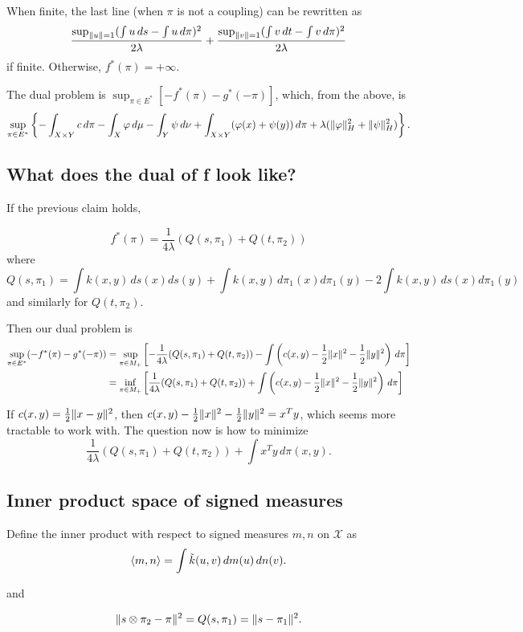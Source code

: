When finite, the last line (when $\pi$ is not a coupling) can be rewritten as
$$\frac{\sup_{\lVert u\rVert=1} (\int u\,ds - \int u\,d\pi)^2}{2\lambda} + \frac{\sup_{\lVert v\rVert=1}(\int v\,dt - \int v\,d\pi)^2}{2\lambda}$$ if finite. Otherwise, $f^{*}(\pi)=+\infty$.

The dual problem is $\sup_{\pi\in E^{*}} \left[ -f^{*}(\pi)-g^{*}(-\pi)\right] $, which, from the above, is
$$ \sup_{\pi\in E^{*}} \left\lbrace - \int_{X\times Y} c\,d\pi - \int_X \varphi\,d\mu - \int_Y \psi\,d\nu + \int_{X\times Y} (\varphi(x)+\psi(y))\,d\pi + \lambda(\lVert\varphi\rVert_H^2+\lVert\psi\rVert_H^2)\right\rbrace . $$

\subsection*{What does the dual of f look like?}

If the previous claim holds,

$$
f^{*}(\pi) = \frac{1}{4\lambda} \left(Q(s,\pi_1) + Q(t,\pi_2)\right)
$$ where $$Q(s,\pi_1) = \int k(x,y)\,ds(x) ds(y) + \int k(x,y)\,d\pi_1(x) d\pi_1(y) - 2 \int k(x,y)\,ds(x)d\pi_1(y)$$ and similarly for $Q(t,\pi_2)$.

Then our dual problem is
\begin{align*}
\sup_{\pi\in E^{*}}(-f^{*}(\pi) - g^{*}(-\pi)) &= \sup_{\pi\in M_{+}} \left[ -\frac{1}{4\lambda} (Q(s,\pi_1)+Q(t,\pi_2)) - \int \left( c(x,y) - \frac{1}{2}\lVert x\rVert^2 - \frac{1}{2}\lVert y\rVert^2 \right)\,d\pi \right] \\
&= \inf_{\pi\in M_{+}} \left[ \frac{1}{4\lambda} (Q(s,\pi_1)+Q(t,\pi_2)) + \int \left( c(x,y) - \frac{1}{2}\lVert x\rVert^2 - \frac{1}{2}\lVert y\rVert^2 \right)\,d\pi \right]
\end{align*}

If $c(x,y)=\frac{1}{2}\lVert x-y\rVert^2$, then $c(x,y)-\frac{1}{2}\lVert x\rVert^2 - \frac{1}{2}\lVert y\rVert^2 = x^{T}y$, which seems more tractable to work with. The question now is how to minimize 
$$
\frac{1}{4\lambda} (Q(s,\pi_1)+Q(t,\pi_2)) + \int x^{T}y\,d\pi(x,y).
$$

\subsection*{Inner product space of signed measures}
Define the inner product with respect to signed measures $m,n$ on $\mathcal{X}$ as $$\langle m,n\rangle = \int \tilde{k}(u,v)\,dm(u)\,dn(v).$$

and

$$\lVert s\otimes \pi_2 - \pi\rVert^2 = Q(s,\pi_1) = \lVert s-\pi_1\rVert^2.$$

